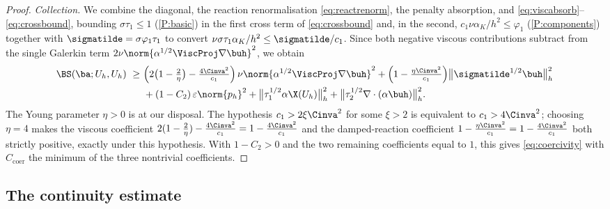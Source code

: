 \begin{proof}
\emph{Collection.}
We combine the diagonal, the reaction renormalisation \eqref{eq:reactrenorm}, the penalty
absorption, and \eqref{eq:viscabsorb}--\eqref{eq:crossbound}, bounding $\sigma\tau_1\le1$
(\ref{P:basic}) in the first cross term of \eqref{eq:crossbound} and, in the second,
$c_1\nu\alpha_K/h^2\le\varphi_1$ (\ref{P:components}) together with
$\sigmatilde=\sigma\varphi_1\tau_1$ to convert
$\nu\sigma\tau_1\alpha_K/h^2\le\sigmatilde/c_1$. Since both negative viscous contributions
subtract from the single Galerkin term $2\nu\norm{\alpha^{1/2}\ViscProj\nabla\buh}^2$, we obtain
\begin{equation}\label{eq:coerccollect}
\begin{aligned}
  \BS(\ba;U_h,U_h)
  \ \ge\ &\Bigl(2\bigl(1-\tfrac{2}{\eta}\bigr)-\tfrac{4\Cinva^2}{c_1}\Bigr)\,
  \nu\norm{\alpha^{1/2}\ViscProj\nabla\buh}^2
  + \Bigl(1-\tfrac{\eta\Cinva^2}{c_1}\Bigr)\bigl\lVert\sigmatilde^{1/2}\buh\bigr\rVert_h^2 \\
  &+ (1-C_2)\,\varepsilon\norm{p_h}^2
  + \bigl\lVert\tau_1^{1/2}\alpha\X(U_h)\bigr\rVert_h^2
  + \bigl\lVert\tau_2^{1/2}\nabla\cdot(\alpha\buh)\bigr\rVert_h^2 .
\end{aligned}
\end{equation}
The Young parameter $\eta>0$ is at our disposal. The hypothesis $c_1>2\xi\Cinva^2$ for some
$\xi>2$ is equivalent to $c_1>4\Cinva^2$; choosing $\eta=4$ makes the viscous coefficient
$2(1-\tfrac{2}{\eta})-\tfrac{4\Cinva^2}{c_1}=1-\tfrac{4\Cinva^2}{c_1}$ and the
damped{\hyp}reaction coefficient $1-\tfrac{\eta\Cinva^2}{c_1}=1-\tfrac{4\Cinva^2}{c_1}$ both
strictly positive, exactly under this hypothesis. With $1-C_2>0$ and the two remaining
coefficients equal to $1$, this gives \eqref{eq:coercivity} with $C_{\mathrm{coer}}$ the
minimum of the three nontrivial coefficients.
\end{proof}

\subsection{The continuity estimate}\label{sec:continuity}

